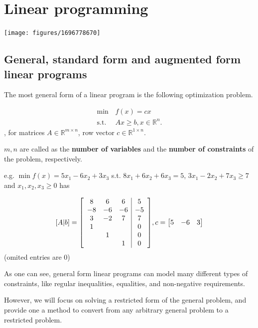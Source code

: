 \chapter{Linear programming} %
\label{sec:Linear programming}
\texttt{[image: figures/1696778670]}
\section{General, standard form and augmented form linear programs} %
\label{sec:General, standard form and augmented form linear programs}

The most general form of a linear program is the following optimization problem.

\begin{align*}
  \min\, &f(x) = cx\\
  \text{s.t.}\, & Ax\ge b, x \in \mathbb{R}^{n}
.\end{align*}, for matrices \( A \in \mathbb{R}^{m \times n}\), row vector
\(c \in \mathbb{R}^{ 1\times  n} \).

\( m, n \) are called as the \textbf{number of variables} and the \textbf{number
of constraints} of the problem, respectively.

e.g. $\min f(x)=5x_{1}-6x_{2}+3x_{3}$ s.t. $8x_{1}+6x_{2}+6x_{3}=5$, $3x_{1}-2x_{2}+7x_{3}\geq 7$ and $x_{1},x_{2},x_{3}\geq 0$ has

\renewcommand\arraystretch{1.3}

\[
  [A|b]=\mleft[
  \begin{array}{ccc|c}
8 & 6 & 6 & 5 \\
-8 & -6 & -6 & -5 \\
3 & -2 & 7 & 7 \\
1 &  &  & 0 \\
 & 1 &  & 0 \\
	 &  & 1 & 0 \\
   \end{array}
   \mright], c=\begin{bmatrix}
5 & -6 & 3
\end{bmatrix}
\] (omited entries are \( 0 \))

As one can see, general form linear programs can model many different types of
constraints, like regular inequalities, equalities, and non-negative
requirements.

However, we will focus on solving a restricted form of the general problem, and
provide one a method to convert from any arbitrary general problem to a
restricted problem.

